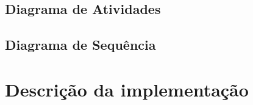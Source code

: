 \subsection{Diagrama de Atividades}

\subsection{Diagrama de Sequência}

\section{Descrição da implementação}


